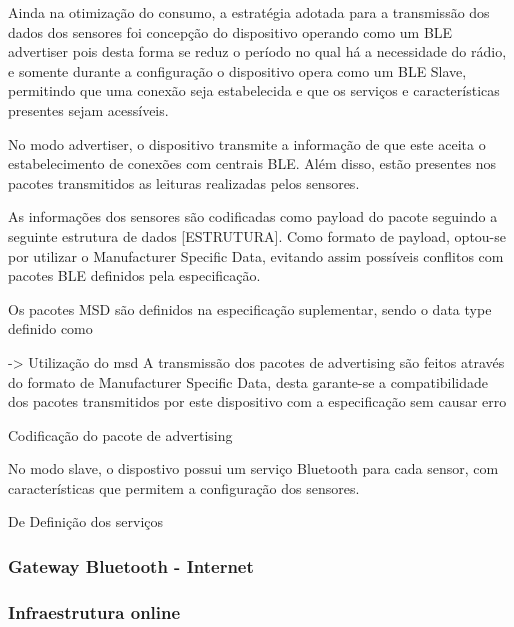 Ainda na otimização do consumo, a estratégia adotada para a transmissão dos
dados dos sensores foi concepção do dispositivo operando como um BLE advertiser
pois desta forma se reduz o período no qual há a necessidade do rádio, e
somente durante a configuração o dispositivo opera como um BLE Slave,
permitindo que uma conexão seja estabelecida e que os serviços e
características presentes sejam acessíveis.

No modo advertiser, o dispositivo transmite a informação de que este aceita o
estabelecimento de conexões com centrais BLE. Além disso, estão presentes nos
pacotes transmitidos as leituras realizadas pelos sensores.

As informações dos sensores são codificadas como payload do pacote seguindo a
seguinte estrutura de dados [ESTRUTURA]. Como formato de payload, optou-se por
utilizar o Manufacturer Specific Data, evitando assim possíveis conflitos com
pacotes BLE definidos pela especificação.



Os pacotes MSD são definidos na especificação suplementar, sendo o data type
definido como  

-> Utilização do msd
A transmissão dos pacotes de advertising são feitos através do formato de
Manufacturer Specific Data, desta garante-se a compatibilidade dos pacotes
transmitidos por este dispositivo com a especificação sem causar erro

Codificação do pacote de advertising

No modo slave, o dispostivo possui um serviço Bluetooth para cada sensor, com características que permitem a configuração dos sensores. 

De
Definição dos serviços



\subsubsection{Gateway Bluetooth - Internet}




\subsubsection{Infraestrutura online}

